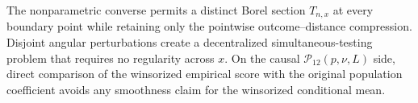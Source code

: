 The nonparametric converse permits a distinct Borel section \(T_{n,x}\) at every boundary point while retaining only the pointwise outcome--distance compression.  Disjoint angular perturbations create a decentralized simultaneous-testing problem that requires no regularity across \(x\).  On the causal \(\mathcal P_{12}(p,\nu,L)\) side, direct comparison of the winsorized empirical score with the original population coefficient avoids any smoothness claim for the winsorized conditional mean.